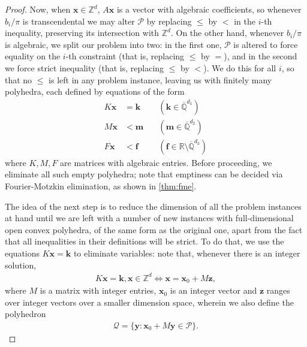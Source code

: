 \begin{proof}
Now, when $\boldsymbol{x} \in \mathbb{Z}^{d}$, $A \boldsymbol{x}$ is a vector with algebraic coefficients, so whenever $b_{i} / \pi$ is transcendental we may alter $\mathcal{P}$ by replacing $\leq$ by $<$ in the $i$-th inequality, preserving its intersection with $\mathbb{Z}^{d}$. On the other hand, whenever $b_{i} / \pi$ is algebraic, we split our problem into two: in the first one, $\mathcal{P}$ is altered to force equality on the $i$-th constraint (that is, replacing $\leq$ by $=$), and in the second we force strict inequality (that is, replacing $\leq$ by $<$). We do this for all $i$, so that no $\leq$ is left in any problem instance, leaving us with finitely many polyhedra, each defined by equations of the form
\begin{align*}
K \boldsymbol{x} &= \boldsymbol{k} \quad &(\boldsymbol{k} \in \overline{\mathbb{Q}}^{d_{1}}) \\
M \boldsymbol{x} &< \boldsymbol{m} \quad &(\boldsymbol{m} \in \overline{\mathbb{Q}}^{d_{2}}) \\
F \boldsymbol{x} &< \boldsymbol{f} \quad &(\boldsymbol{f} \in \mathbb{R} \setminus \overline{\mathbb{Q}}^{d_{3}})
\end{align*}
where $K,M,F$ are matrices with algebraic entries. Before proceeding, we eliminate all such empty polyhedra; note that emptiness can be decided via Fourier-Motzkin elimination, as shown in \cref{thm:fme}.

The idea of the next step is to reduce the dimension of all the problem instances at hand until we are left with a number of new instances with full-dimensional open convex polyhedra, of the same form as the original one, apart from the fact that all inequalities in their definitions will be strict. To do that, we use the equations $K \boldsymbol{x} = \boldsymbol{k}$ to eliminate variables: note that, whenever there is an integer solution,
\begin{align*}
K \boldsymbol{x} = \boldsymbol{k}, \boldsymbol{x} \in \mathbb{Z}^{d} \Leftrightarrow \boldsymbol{x} = \boldsymbol{x}_{0} + M \boldsymbol{z},
\end{align*}
where $M$ is a matrix with integer entries, $\boldsymbol{x}_{0}$ is an integer vector and $\boldsymbol{z}$ ranges over integer vectors over a smaller dimension space, wherein we also define the polyhedron
\begin{align*}
\mathcal{Q} = \lbrace \boldsymbol{y} : \boldsymbol{x}_{0} + M \boldsymbol{y} \in \mathcal{P} \rbrace .
\end{align*}


\end{proof}
